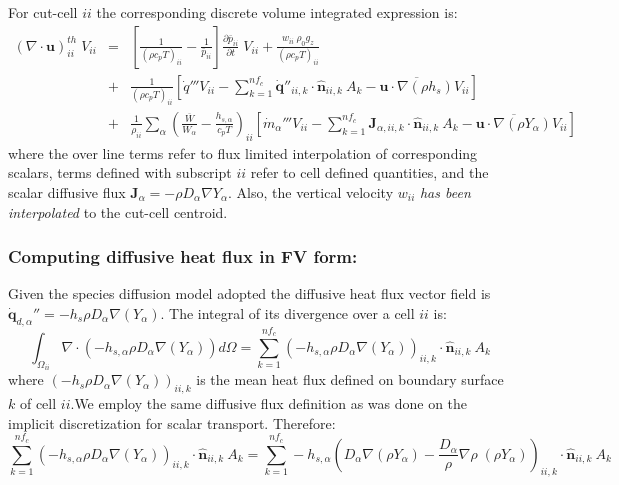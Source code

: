 \documentclass[12pt]{article}
\begin{document}
For cut-cell $ii$ the corresponding discrete volume integrated expression is:
%
\begin{eqnarray}
    ( \nabla \cdot \mathbf{u} )_{ii}^{th} \; V_{ii} &=&
    \left[ \frac{1}{(\rho c_p T)_{ii}} - \frac{1}{\bar{p}_{ii}} \right]
    \frac{\partial \bar{p}_{ii}}{\partial t} \; V_{ii} +
    \frac{w_{ii} \: \rho_0 g_z}{(\rho c_p T)_{ii}} \nonumber \\
    &+& \frac{1}{(\rho c_p T)_{ii}} \left[ \dot{q}''' V_{ii} -
    \sum_{k=1}^{nf_c} \dot{\mathbf{q}}''_{ii,k} \cdot \hat{\mathbf{n}}_{ii,k} \: A_k
    - \overline{\mathbf{u} \cdot \nabla (\rho h_s)} V_{ii} \right] \nonumber \\
    &+& \frac{1}{\rho_{ii}} \sum_\alpha \left( \frac{\overline{W}}{W_\alpha} - \frac{h_{s,\alpha}}{c_p T} \right)_{ii} \left[ \dot{m}_\alpha''' V_{ii} -
    \sum_{k=1}^{nf_c} \mathbf{J}_{\alpha,ii,k} \cdot \hat{\mathbf{n}}_{ii,k} \: A_k
    - \overline{\mathbf{u} \cdot \nabla (\rho Y_\alpha)} V_{ii} \right] \label{eq:divth2}
\end{eqnarray}
%
where the over line terms refer to flux limited interpolation of corresponding scalars, terms defined with subscript $ii$ refer to cell defined quantities, and the scalar diffusive flux $\mathbf{J}_\alpha=- \rho D_\alpha \nabla Y_\alpha$. Also, the vertical velocity $w_{ii}$ \textit{has been interpolated} to the cut-cell centroid.

\subsubsection{Computing diffusive heat flux in FV form:}

Given the species diffusion model adopted the diffusive heat flux vector field is $\dot{\mathbf{q}}_{d,\alpha}''=-h_s \rho D_\alpha \nabla(Y_\alpha)$. The integral of its divergence over a cell $ii$ is:
\begin{equation}
    \int_{\Omega_{ii}} {\nabla \cdot \left(-h_{s,\alpha} \rho D_\alpha \nabla(Y_\alpha) \right)} d\Omega = \sum_{k=1}^{nf_c} \left(-h_{s,\alpha} \rho D_\alpha \nabla(Y_\alpha) \right)_{ii,k} \cdot \hat{\mathbf{n}}_{ii,k}  \: A_k
\end{equation}
where $\left(-h_s \rho D_\alpha \nabla(Y_\alpha) \right)_{ii,k}$ is the mean heat flux defined on boundary surface $k$ of cell $ii$.We employ the same diffusive flux definition as was done on the implicit discretization for scalar transport. Therefore:
\begin{equation}
    \sum_{k=1}^{nf_c} \left(-h_{s,\alpha} \rho D_\alpha \nabla(Y_\alpha) \right)_{ii,k} \cdot \hat{\mathbf{n}}_{ii,k}  \: A_k =
    \sum_{k=1}^{nf_c} -h_{s,\alpha} \left(D_\alpha \nabla(\rho Y_\alpha) -
    \frac{D_\alpha}{\rho} \nabla \rho \; (\rho Y_\alpha) \right)_{ii,k} \cdot \hat{\mathbf{n}}_{ii,k}  \: A_k
\end{equation}
\end{document}
